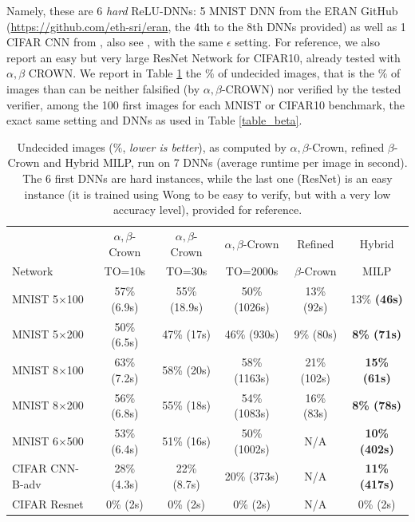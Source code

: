 Namely, these are 6 {\em hard} ReLU-DNNs: 5 MNIST DNN from the ERAN GitHub (\url{https://github.com/eth-sri/eran}, the 4th to the 8th DNNs provided) as well as 1 CIFAR CNN from 
\cite{AdversarialTrainingAndProvableDefenses}, also see \cite{SDPFI}, with the same $\epsilon$ setting. For reference, we also report an easy but very large ResNet Network for CIFAR10, already tested with $\alpha,\beta$ CROWN. We report in Table \ref{table_hybrid} the $\%$ of undecided images, that is the $\%$ of images than can be neither falsified (by $\alpha,\beta$-CROWN) nor verified by the tested verifier, among the 100 first images for each MNIST or CIFAR10 benchmark, the exact same setting and DNNs as used in Table \ref{table_beta}.


\begin{table}[t!]
	\centering
	\begin{tabular}{||l||c|c|c|c||c||}
		\hline \hline
		 & $\alpha,\beta$-Crown & $\alpha,\beta$-Crown & $\alpha,\beta$-Crown & Refined & Hybrid \\ 
		 Network & TO=10s & TO=30s & TO=2000s & $\beta$-Crown & MILP \\ 
		\hline
		MNIST 5$\times$100 & 57\% (6.9s) & 55\% (18.9s) & 50\% (1026s) & 13\% 
		(92s) & 13\% \bf (46s) \\ \hline
		MNIST 5$\times$200 & 50\% (6.5s) & 47\% (17s) & 46\% (930s) & 9\% (80s) & \bf 8\% (71s) \\ \hline
		MNIST 8$\times$100 & 63\% (7.2s) & 58\% (20s) & 58\% (1163s) & 21\% (102s) & \bf 15\% (61s) \\ \hline
		MNIST 8$\times$200 & 56\% (6.8s) & 55\% (18s) & 54\% (1083s) & 16\% (83s) & \bf 8\% (78s) \\ \hline
		MNIST 6$\times$500 & 53\% (6.4s) & 51\% (16s) & 50\% (1002s) & N/A & 
		\bf 10\% (402s) \\ \hline
		CIFAR CNN-B-adv & 28\% (4.3s) & 22\% (8.7s) & 20\% (373s) & N/A & \bf 11\% (417s) \\ \hline \hline
		CIFAR Resnet & 0\% (2s) & 0\% (2s) & 0\% (2s) & N/A & 0\% (2s) \\ \hline \hline
	\end{tabular}
	\caption{Undecided images ($\%$, {\em lower is better}), as computed by $\alpha,\beta$-Crown, refined $\beta$-Crown and Hybrid MILP, run on 7 DNNs (average runtime per image in second). The 6 first DNNs are hard instances, while the last one (ResNet) is an easy instance (it is trained using Wong to be easy to verify, but with a very low accuracy level), provided for reference.}
	\label{table_hybrid}
	\end{table}

